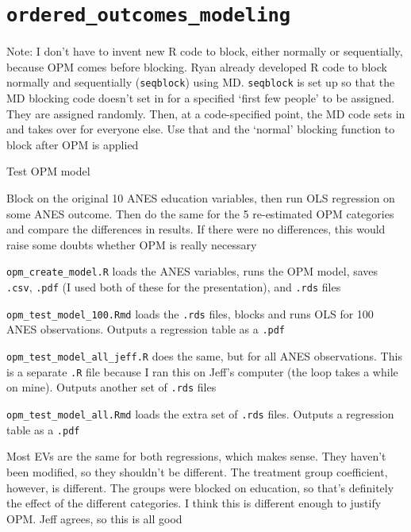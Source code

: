 \documentclass[12pt]{article}
\begin{document}
\section*{\texttt{ordered\_outcomes\_modeling}}
	\begin{coi}
		\item Note: I don't have to invent new R code to block, either normally or sequentially, because OPM comes before blocking. Ryan already developed R code to block normally and sequentially ({\tt seqblock}) using MD. {\tt seqblock} is set up so that the MD blocking code doesn't set in for a specified `first few people' to be assigned. They are assigned randomly. Then, at a code-specified point, the MD code sets in and takes over for everyone else. Use that and the `normal' blocking function to block after OPM is applied
		\item Test OPM model
			\begin{coi}
				\item Block on the original 10 ANES education variables, then run OLS regression on some ANES outcome. Then do the same for the 5 re-estimated OPM categories and compare the differences in results. If there were no differences, this would raise some doubts whether OPM is really necessary
					\begin{coi}
						\item \texttt{opm\_create\_model.R} loads the ANES variables, runs the OPM model, saves \texttt{.csv}, \texttt{.pdf} (I used both of these for the presentation), and \texttt{.rds} files
						\item \texttt{opm\_test\_model\_100.Rmd} loads the \texttt{.rds} files, blocks and runs OLS for 100 ANES observations. Outputs a regression table as a \texttt{.pdf}
						\item \texttt{opm\_test\_model\_all\_jeff.R} does the same, but for all ANES observations. This is a separate \texttt{.R} file because I ran this on Jeff's computer (the loop takes a while on mine). Outputs another set of \texttt{.rds} files
						\item \texttt{opm\_test\_model\_all.Rmd} loads the extra set of \texttt{.rds} files. Outputs a regression table as a \texttt{.pdf}
						\item Most EVs are the same for both regressions, which makes sense. They haven't been modified, so they shouldn't be different. The treatment group coefficient, however, is different. The groups were blocked on education, so that's definitely the effect of the different categories. I think this is different enough to justify OPM. Jeff agrees, so this is all good

\end{coi}
\end{coi}
\end{coi}
\end{document}
